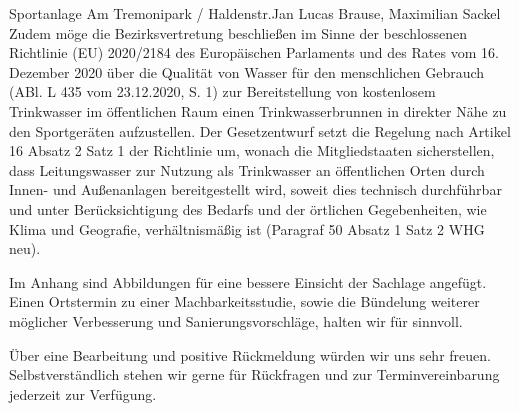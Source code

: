 \documentclass{../../templates/amendment}
\begin{document}
\begin{boxed}{Sportanlage Am Tremonipark / Haldenstr.}{Jan Lucas Brause, Maximilian Sackel}
    Zudem möge die Bezirksvertretung beschließen im Sinne der beschlossenen Richtlinie (EU) 2020/2184 des Europäischen Parlaments und des Rates vom 16. Dezember 2020 über die Qualität von Wasser für den menschlichen Gebrauch (ABl. L 435 vom 23.12.2020, S. 1) zur Bereitstellung von kostenlosem Trinkwasser im öffentlichen Raum einen Trinkwasserbrunnen in direkter Nähe zu den Sportgeräten aufzustellen.
    Der Gesetzentwurf setzt die Regelung nach Artikel 16 Absatz 2 Satz 1 der Richtlinie um, wonach die Mitgliedstaaten sicherstellen, dass Leitungswasser zur Nutzung als Trinkwasser an öffentlichen Orten durch Innen- und Außenanlagen bereitgestellt wird, soweit dies technisch durchführbar und unter Berücksichtigung des Bedarfs und der örtlichen Gegebenheiten, wie Klima und Geografie, verhältnismäßig ist (Paragraf 50 Absatz 1 Satz 2 WHG neu).

    Im Anhang sind Abbildungen für eine bessere Einsicht der Sachlage angefügt.
    Einen Ortstermin zu einer Machbarkeitsstudie, sowie die Bündelung weiterer möglicher Verbesserung und Sanierungsvorschläge, halten wir für sinnvoll.

    Über eine Bearbeitung und positive Rückmeldung würden wir uns sehr freuen.
    Selbstverständlich stehen wir gerne für Rückfragen und zur Terminvereinbarung jederzeit zur Verfügung.


\end{boxed}
\end{document}
